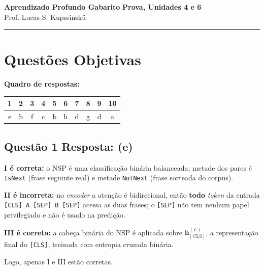 \documentclass[11pt,a4paper]{article}
\begin{document}
{\Large\bfseries Aprendizado Profundo \textemdash{} Gabarito} \hfill \textbf{Prova, Unidades 4 e 6}\\
Prof. Lucas S. Kupssinskü

\rule{\linewidth}{0.8pt}

\section*{Questões Objetivas}

\textbf{Quadro de respostas:}
\begin{center}
\begin{tabular}{|c|c|c|c|c|c|c|c|c|c|}
\hline
1 & 2 & 3 & 4 & 5 & 6 & 7 & 8 & 9 & 10 \\\hline
e & b & f & c & b & h & d & g & d & a \\\hline
\end{tabular}
\end{center}

\color{blue}

\subsection*{Questão 1 \textemdash{} Resposta: (e)}
\textbf{I é correta:} o NSP é uma classificação binária balanceada; metade dos pares é \texttt{IsNext} (frase seguinte real) e metade \texttt{NotNext} (frase sorteada do corpus).

\textbf{II é incorreta:} no \textit{encoder} a atenção é bidirecional, então \textbf{todo} \textit{token} da entrada \texttt{[CLS] A [SEP] B [SEP]} acessa as duas frases; o \texttt{[SEP]} não tem nenhum papel privilegiado e não é usado na predição.

\textbf{III é correta:} a cabeça binária do NSP é aplicada sobre $\mathbf{h}_{[\text{CLS}]}^{(L)}$, a representação final do \texttt{[CLS]}, treinada com entropia cruzada binária.

Logo, apenas I e III estão corretas.
\end{document}
